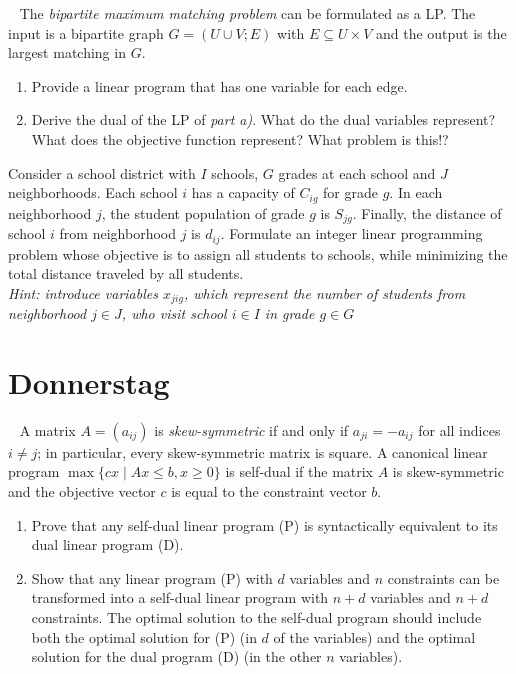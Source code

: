 \documentclass{uebung_cs}
\begin{document}
\begin{aufgabe}\
	The \emph{bipartite maximum matching problem} can be formulated as a \acs{LP}. The input is a bipartite graph $G=(U\cup V;E)$ with $E \subseteq U \times V$ and the output is the largest matching in $G$.
	\begin{enumerate}
		\item Provide a linear program that has one variable for each edge.
		\item Derive the dual of the \acs{LP} of \emph{part a)}. What do the dual variables represent? What does the objective function represent? What problem is this!?
	\end{enumerate}
\end{aufgabe}


\begin{aufgabe}
	Consider a school district with $I$ schools, $G$ grades at each school and $J$ neighborhoods. Each school $i$ has a capacity of $C_{ig}$ for grade $g$. In each neighborhood $j$, the student population of grade $g$ is $S_{jg}$. Finally, the distance of school $i$ from neighborhood $j$ is $d_{ij}$. Formulate an integer linear programming problem whose objective is to assign all students to schools, while minimizing the total distance traveled by all students.\\
	\emph{Hint: introduce variables $x_{jig}$, which represent the number of students from neighborhood $j \in J$, who visit school $i \in I$ in grade $g \in G$}
\end{aufgabe}

\section*{Donnerstag}

\begin{aufgabe}\
	A matrix $A=(a_{ij})$ is \emph{skew-symmetric} if and only if $a_{ji} = −a_{ij}$ for all indices $i \neq j$; in particular, every skew-symmetric matrix is square. A canonical linear program $\max\{cx  \; | \; Ax \leq b, x \geq 0\}$ is self-dual if the matrix $A$ is skew-symmetric and the objective vector $c$ is equal to the constraint vector $b$.
	\begin{enumerate}
		\item Prove that any self-dual linear program (P) is syntactically equivalent to its dual linear program (D).
		\item Show that any linear program (P) with $d$ variables and $n$ constraints can be transformed into a self-dual linear program with $n + d$ variables and $n + d$ constraints. The optimal solution to the self-dual program should include both the optimal solution for (P) (in $d$ of the variables) and the optimal solution for the dual program (D) (in the other $n$ variables).
	\end{enumerate}
\end{aufgabe}
\end{document}
